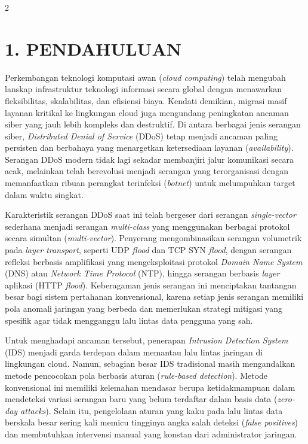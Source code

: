 \documentclass[10pt,a4paper]{article}
\begin{document}
\begin{multicols}{2}

\section*{\textbf{1. PENDAHULUAN}}

Perkembangan teknologi komputasi awan (\textit{cloud computing}) telah mengubah lanskap infrastruktur teknologi informasi secara global dengan menawarkan fleksibilitas, skalabilitas, dan efisiensi biaya. Kendati demikian, migrasi masif layanan kritikal ke lingkungan cloud juga mengundang peningkatan ancaman siber yang jauh lebih kompleks dan destruktif. Di antara berbagai jenis serangan siber, \textit{Distributed Denial of Service} (DDoS) tetap menjadi ancaman paling persisten dan berbahaya yang menargetkan ketersediaan layanan (\textit{availability}). Serangan DDoS modern tidak lagi sekadar membanjiri jalur komunikasi secara acak, melainkan telah berevolusi menjadi serangan yang terorganisasi dengan memanfaatkan ribuan perangkat terinfeksi (\textit{botnet}) untuk melumpuhkan target dalam waktu singkat.

Karakteristik serangan DDoS saat ini telah bergeser dari serangan \textit{single-vector} sederhana menjadi serangan \textit{multi-class} yang menggunakan berbagai protokol secara simultan (\textit{multi-vector}). Penyerang mengombinasikan serangan volumetrik pada \textit{layer transport}, seperti UDP \textit{flood} dan TCP SYN \textit{flood}, dengan serangan refleksi berbasis amplifikasi yang mengeksploitasi protokol \textit{Domain Name System} (DNS) atau \textit{Network Time Protocol} (NTP), hingga serangan berbasis \textit{layer} aplikasi (HTTP \textit{flood}). Keberagaman jenis serangan ini menciptakan tantangan besar bagi sistem pertahanan konvensional, karena setiap jenis serangan memiliki pola anomali jaringan yang berbeda dan memerlukan strategi mitigasi yang spesifik agar tidak mengganggu lalu lintas data pengguna yang sah.

Untuk menghadapi ancaman tersebut, penerapan \textit{Intrusion Detection System} (IDS) menjadi garda terdepan dalam memantau lalu lintas jaringan di lingkungan cloud. Namun, sebagian besar IDS tradisional masih mengandalkan metode pencocokan pola berbasis aturan (\textit{rule-based detection}). Metode konvensional ini memiliki kelemahan mendasar berupa ketidakmampuan dalam mendeteksi variasi serangan baru yang belum terdaftar dalam basis data (\textit{zero-day attacks}). Selain itu, pengelolaan aturan yang kaku pada lalu lintas data berskala besar sering kali memicu tingginya angka salah deteksi (\textit{false positives}) dan membutuhkan intervensi manual yang konstan dari administrator jaringan.


\end{multicols}
\end{document}
